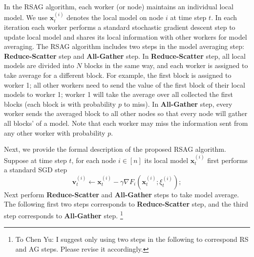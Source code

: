 \documentclass{article}
\def\rc{\color{red}}
\newcounter{ass_counter}
\newcounter{thm_counter}
\begin{document}

{\rc In the RSAG algorithm, each worker (or node) maintains an individual local model. We use $\bm{x}^{(i)}_t$ denotes the local model on node $i$ at time step $t$. In each iteration each worker performs a standard stochastic gradient descent step to update local model and shares its local information with other workers for model averaging. The RSAG algorithm includes two steps in the model averaging step:} \textbf{Reduce-Scatter} step and \textbf{All-Gather} step. In \textbf{Reduce-Scatter} step, {\rc all local models are divided into $N$ blocks in the same way, and each worker is assigned to take average for a different block. For example, the first block is assigned to worker 1; all other workers need to send the value of the first block of their local models to worker 1; worker 1 will take the average over all collected the first blocks (each block is with probability $p$ to miss).
In \textbf{All-Gather} step, every worker sends the averaged block to all other nodes so that every node will gather all blocks' of a model. Note that each worker may miss the information sent from any other worker with probability $p$. 
}

Next, we {\rc provide} the formal {\rc description} of {the proposed RSAG algorithm}. Suppose at time step $t$, {\rc for each node $i\in [n]$ its local model $\bm{x}_t^{(i)}$ first performs a standard SGD step
\[
\bm{v}^{(i)}_t \leftarrow \bm{x}^{(i)}_t - \gamma \nabla F_i(\bm{x}^{(i)}_t; {\xi}^{(i)}_t);
\]
Next perform \textbf{Reduce-Scatter} and \textbf{All-Gather} steps to take model average. The following first two steps corresponds to \textbf{Reduce-Scatter} step, and the third step corresponds to \textbf{All-Gather} step.
}
\footnote{\rc To Chen Yu: I suggest only using two steps in the following to correspond RS and AG steps. Please revise it accordingly.}
\end{document}
